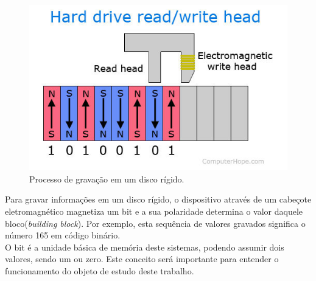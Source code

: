 \begin{figure}[H]
    \centering
    \includegraphics[scale = 0.5]{source/pictures/magnetic-media.jpg}
    \caption{Processo de gravação em um disco rígido\cite{hdd-image}.}
    \label{fig:hdd-recording}
\end{figure}

Para gravar informações em um disco rígido, o dispositivo através de um cabeçote eletromagnético magnetiza um bit e a sua polaridade determina o valor daquele bloco(\textit{building block})\cite{hdd-image}. Por exemplo, esta sequência de valores gravados significa o número 165 em código binário.\\ O bit é a unidade básica de memória deste sistemas, podendo assumir dois valores, sendo um ou zero. Este conceito será importante para entender o funcionamento do objeto de estudo deste trabalho.


